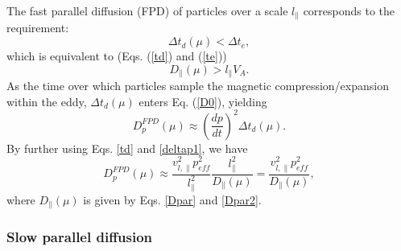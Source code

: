 \documentclass[preprint2,twocolumn,times,tighten]{aastex63}
\begin{document}
{The fast parallel diffusion (FPD) of particles over a scale $l_\|$ corresponds to the requirement:
\begin{equation}
    \Delta t_d (\mu) < \Delta t_e,
    \label{less0}
\end{equation}
which is equivalent to 
(Eqs. (\ref{td}) and (\ref{te})) 
\begin{equation}
    D_\| (\mu) > l_\| V_A.
    \label{geq}
\end{equation}
 As the time over which particles sample the magnetic compression/expansion within the eddy, 
 $\Delta t_d(\mu)$ enters
 Eq. (\ref{D0}), yielding 
\begin{equation}
    D_p^{FPD} (\mu) \approx \left(\frac{dp}{dt}\right)^2 \Delta t_d (\mu).
    \label{D0f}
\end{equation}
By further using Eqs. \eqref{td} and \eqref{deltap1}, 
we have 
\begin{equation}
    D_p^{FPD} (\mu)\approx \frac{v_{l,\|}^2 p_{eff}^2}{l_{\|}^2}\frac{l_{\|}^2}{D_\|(\mu)}=\frac{v_{l,\|}^2 p_{eff}^2}{ D_\| (\mu)},
    \label{Dpmu}
\end{equation}
where $D_\| (\mu)$ is given by Eqs. \eqref{Dpar} and \eqref{Dpar2}.




\subsubsection{Slow parallel diffusion}

}
\end{document}

